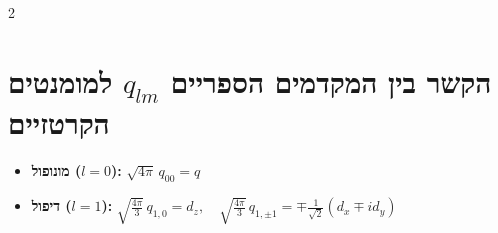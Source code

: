 \documentclass[10pt,a4paper]{article}
\begin{document}
\begin{multicols*}{2}
\section*{הקשר בין המקדמים הספריים $q_{lm}$ למומנטים הקרטזיים}

\begin{itemize}[leftmargin=*]

    \item \textbf{מונופול ($l=0$):}
    $\sqrt{4\pi} \, q_{00} = q$

    \item \textbf{דיפול ($l=1$):}
    $\sqrt{\frac{4\pi}{3}} \, q_{1,0} = d_z, \quad \sqrt{\frac{4\pi}{3}} \, q_{1,\pm 1} = \mp \frac{1}{\sqrt{2}} \left(d_x \mp i d_y\right)$
\end{itemize}

\end{multicols*}
\end{document}
